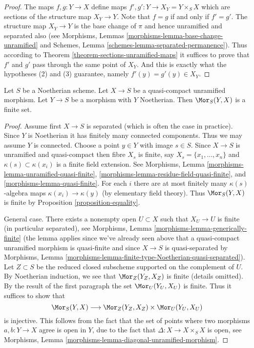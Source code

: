 \begin{proof}
The maps $f, g : Y \to X$ define maps $f', g' : Y \to X_Y = Y \times_S X$
which are sections of the structure map $X_Y \to Y$.
Note that $f = g$ if and only if $f' = g'$.
The structure map $X_Y \to Y$ is the base change of $\pi$ and hence
unramified and separated also (see
Morphisms, Lemmas \ref{morphisms-lemma-base-change-unramified} and
Schemes, Lemma \ref{schemes-lemma-separated-permanence}).
Thus according to Theorem \ref{theorem-sections-unramified-maps}
it suffices to prove that $f'$ and $g'$ pass through the same
point of $X_Y$. And this is exactly what the hypotheses (2) and (3)
guarantee, namely $f'(y) = g'(y) \in X_Y$.
\end{proof}

\begin{lemma}
\label{lemma-finitely-many-maps-to-unramified}
Let $S$ be a Noetherian scheme. Let $X \to S$ be a quasi-compact unramified
morphism. Let $Y \to S$ be a morphism with $Y$ Noetherian. Then
$\Mor_S(Y, X)$ is a finite set.
\end{lemma}

\begin{proof}
Assume first $X \to S$ is separated (which is often the case in practice).
Since $Y$ is Noetherian it has finitely many connected components. Thus we
may assume $Y$ is connected. Choose a point $y \in Y$ with image $s \in S$.
Since $X \to S$ is unramified and quasi-compact
then fibre $X_s$ is finite, say $X_s = \{x_1, \ldots, x_n\}$
and $\kappa(s) \subset \kappa(x_i)$ is a finite field extension.
See Morphisms, Lemma \ref{morphisms-lemma-unramified-quasi-finite},
\ref{morphisms-lemma-residue-field-quasi-finite}, and
\ref{morphisms-lemma-quasi-finite}.
For each $i$ there are at most finitely many $\kappa(s)$-algebra
maps $\kappa(x_i) \to \kappa(y)$ (by elementary field theory).
Thus $\Mor_S(Y, X)$ is finite by
Proposition \ref{proposition-equality}.

\medskip\noindent
General case. There exists a nonempty open $U \subset X$ such
that $X_U \to U$ is finite (in particular separated), see
Morphisms, Lemma \ref{morphisms-lemma-generically-finite}
(the lemma applies since we've already seen above that a quasi-compact
unramified morphism is quasi-finite and since $X \to S$ is quasi-separated by
Morphisms, Lemma \ref{morphisms-lemma-finite-type-Noetherian-quasi-separated}).
Let $Z \subset S$ be the reduced closed subscheme supported on
the complement of $U$. By Noetherian induction, we see that
$\Mor_Z(Y_Z, X_Z)$ is finite (details omitted).
By the result of the first paragraph the set
$\Mor_U(Y_U, X_U)$ is finite. Thus it suffices to show that
$$
\Mor_S(Y, X) \longrightarrow \Mor_Z(Y_Z, X_Z) \times \Mor_U(Y_U, X_U)
$$
is injective. This follows from the fact that the set of points where
two morphisms $a, b : Y \to X$ agree is open in $Y$, due to the fact
that $\Delta : X \to X \times_S X$ is open, see
Morphisms, Lemma \ref{morphisms-lemma-diagonal-unramified-morphism}.
\end{proof}







